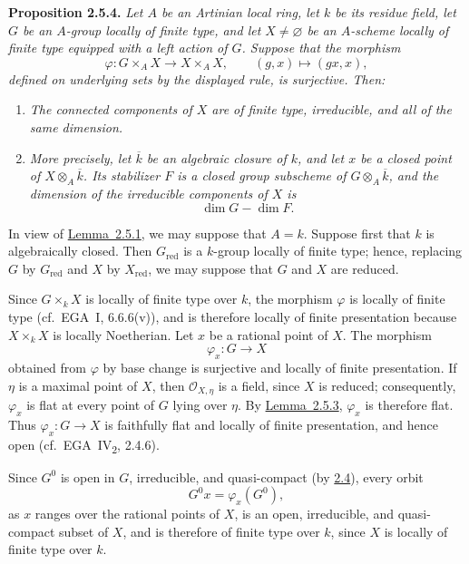 \medskip
{}\label{prop:sga3-VIA-2.5.4}%
\noindent\textbf{Proposition 2.5.4.}
\textit{Let \(A\) be an Artinian local ring, let \(k\) be its residue
field, let \(G\) be an \(A\)-group locally of finite type, and let
\(X\ne\varnothing\) be an \(A\)-scheme locally of finite type equipped
with a left action of \(G\). Suppose that the morphism
\[
  \varphi:G\times_AX\longrightarrow X\times_AX,
  \qquad (g,x)\longmapsto(gx,x),
\]
defined on underlying sets by the displayed rule, is surjective. Then:}
\begin{enumerate}
\item[(i)] \textit{The connected components of \(X\) are of finite
type, irreducible, and all of the same dimension.}
\item[(ii)]\label{concl:sga3-VIA-2.5.4-ii} \textit{More precisely, let \(\overline{k}\) be an
algebraic closure of \(k\), and let \(x\) be a closed point of
\(X\otimes_A\overline{k}\). Its stabilizer \(F\) is a closed group
subscheme of \(G\otimes_A\overline{k}\), and the dimension of the
irreducible components of \(X\) is
\[
  \dim G-\dim F.
\]}
\end{enumerate}

In view of \hyperref[lem:sga3-VIA-2.5.1]{Lemma~2.5.1}, we may suppose
that \(A=k\). Suppose first that \(k\) is algebraically closed. Then
\(G_{\mathrm{red}}\) is a \(k\)-group locally of finite type; hence,
replacing \(G\) by \(G_{\mathrm{red}}\) and \(X\) by
\(X_{\mathrm{red}}\), we may suppose that \(G\) and \(X\) are reduced.

Since \(G\times_kX\) is locally of finite type over \(k\), the morphism
\(\varphi\) is locally of finite type (cf.\ EGA~I, 6.6.6(v)), and is
therefore locally of finite presentation because \(X\times_kX\) is
locally Noetherian. Let \(x\) be a rational point of \(X\). The
morphism
\[
  \varphi_x:G\longrightarrow X
\]
obtained from \(\varphi\) by base change is surjective and locally of
finite presentation. If \(\eta\) is a maximal point of \(X\), then
\(\mathcal O_{X,\eta}\) is a field, since \(X\) is reduced; consequently,
\(\varphi_x\) is flat at every point of \(G\) lying over \(\eta\).
By \hyperref[lem:sga3-VIA-2.5.3]{Lemma~2.5.3}, \(\varphi_x\) is
therefore flat. Thus \(\varphi_x:G\to X\) is faithfully flat and
locally of finite presentation, and hence open (cf.\
EGA~IV\textsubscript{2}, 2.4.6).

Since \(G^0\) is open in \(G\), irreducible, and quasi-compact
(by \hyperref[prop:sga3-VIA-2.4]{2.4}), every orbit
\[
  G^0x=\varphi_x(G^0),
\]
as \(x\) ranges over the rational points of \(X\), is an open,
irreducible, and quasi-compact subset of \(X\), and is therefore of
finite type over \(k\), since \(X\) is locally of finite type over
\(k\).

